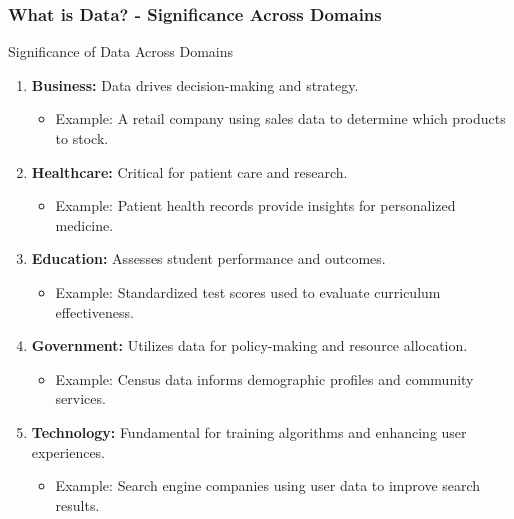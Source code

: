 \documentclass{beamer}
\begin{document}
\begin{frame}[fragile]
    \frametitle{What is Data? - Significance Across Domains}
    \begin{block}{Significance of Data Across Domains}
        \begin{enumerate}
            \item \textbf{Business:} Data drives decision-making and strategy.
                \begin{itemize}
                    \item Example: A retail company using sales data to determine which products to stock.
                \end{itemize}
            \item \textbf{Healthcare:} Critical for patient care and research.
                \begin{itemize}
                    \item Example: Patient health records provide insights for personalized medicine.
                \end{itemize}
            \item \textbf{Education:} Assesses student performance and outcomes.
                \begin{itemize}
                    \item Example: Standardized test scores used to evaluate curriculum effectiveness.
                \end{itemize}
            \item \textbf{Government:} Utilizes data for policy-making and resource allocation.
                \begin{itemize}
                    \item Example: Census data informs demographic profiles and community services.
                \end{itemize}
            \item \textbf{Technology:} Fundamental for training algorithms and enhancing user experiences.
                \begin{itemize}
                    \item Example: Search engine companies using user data to improve search results.
                \end{itemize}
        \end{enumerate}
    \end{block}
\end{frame}
\end{document}
